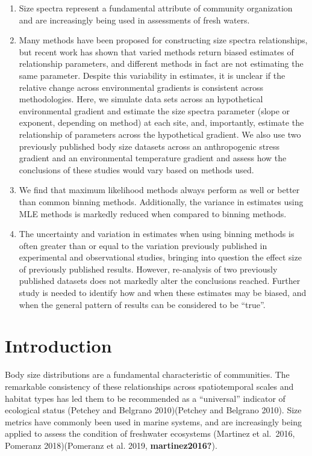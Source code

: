 \documentclass[
]{article}
\providecommand{\tightlist}{%
  \setlength{\itemsep}{0pt}\setlength{\parskip}{0pt}}
\begin{document}
\begin{enumerate}
\def\labelenumi{\arabic{enumi}.}
\tightlist
\item
  Size spectra represent a fundamental attribute of community
  organization and are increasingly being used in assessments of fresh
  waters.
\item
  Many methods have been proposed for constructing size spectra
  relationships, but recent work has shown that varied methods return
  biased estimates of relationship parameters, and different methods in
  fact are not estimating the same parameter. Despite this variability
  in estimates, it is unclear if the relative change across
  environmental gradients is consistent across methodologies. Here, we
  simulate data sets across an hypothetical environmental gradient and
  estimate the size spectra parameter (slope or exponent, depending on
  method) at each site, and, importantly, estimate the relationship of
  parameters across the hypothetical gradient. We also use two
  previously published body size datasets across an anthropogenic stress
  gradient and an environmental temperature gradient and assess how the
  conclusions of these studies would vary based on methods used.
\item
  We find that maximum likelihood methods always perform as well or
  better than common binning methods. Additionally, the variance in
  estimates using MLE methods is markedly reduced when compared to
  binning methods.
\item
  The uncertainty and variation in estimates when using binning methods
  is often greater than or equal to the variation previously published
  in experimental and observational studies, bringing into question the
  effect size of previously published results. However, re-analysis of
  two previously published datasets does not markedly alter the
  conclusions reached. Further study is needed to identify how and when
  these estimates may be biased, and when the general pattern of results
  can be considered to be ``true''.
\end{enumerate}

\hypertarget{introduction}{%
\section{Introduction}\label{introduction}}

Body size distributions are a fundamental characteristic of communities.
The remarkable consistency of these relationships across spatiotemporal
scales and habitat types has led them to be recommended as a
``universal'' indicator of ecological status (Petchey and Belgrano
2010)(Petchey and Belgrano 2010). Size metrics have commonly been used
in marine systems, and are increasingly being applied to assess the
condition of freshwater ecosystems (Martinez et al.~2016, Pomeranz
2018)(Pomeranz et al. 2019, \textbf{martinez2016?}).
\end{document}
